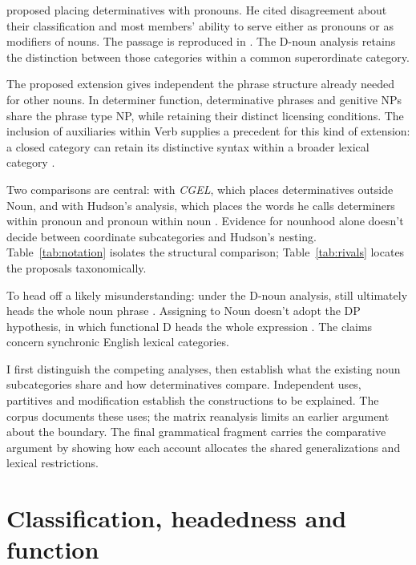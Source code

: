 \documentclass[12pt]{article}
\begin{document}
\textcite[24]{palmer1924} proposed placing determinatives with pronouns. He cited disagreement about their classification and most members' ability to serve either as pronouns or as modifiers of nouns. The passage is reproduced in \textcite[3]{reynolds2013determiners}. The D-noun analysis retains the distinction between those categories within a common superordinate category.

The proposed extension gives independent  the phrase structure already needed for other nouns. In determiner function, determinative phrases and genitive NPs share the phrase type NP, while retaining their distinct licensing conditions. The inclusion of auxiliaries within Verb supplies a precedent for this kind of extension: a closed category can retain its distinctive syntax within a broader lexical category \citep{pullumwilson1977}.

Two comparisons are central: with \textit{CGEL}, which places determinatives outside Noun, and with Hudson's analysis, which places the words he calls determiners within pronoun and pronoun within noun \citep{hudson2004determiners,hudson2010wordgrammar}. Evidence for nounhood alone doesn't decide between coordinate subcategories and Hudson's nesting. Table~\ref{tab:notation} isolates the structural comparison; Table~\ref{tab:rivals} locates the proposals taxonomically.

To head off a likely misunderstanding: under the D-noun analysis,  still ultimately heads the whole noun phrase . Assigning  to Noun doesn't adopt the DP hypothesis, in which functional D heads the whole expression \citep{abney1987}. The claims concern synchronic English lexical categories.

I first distinguish the competing analyses, then establish what the existing noun subcategories share and how determinatives compare. Independent uses, partitives and modification establish the constructions to be explained. The corpus documents these uses; the matrix reanalysis limits an earlier argument about the boundary. The final grammatical fragment carries the comparative argument by showing how each account allocates the shared generalizations and lexical restrictions.

\section{Classification, headedness and function}\label{sec:alternatives}
\end{document}
